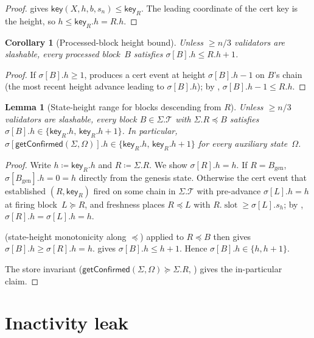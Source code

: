 \documentclass{article}
\newcommand{\genesis}{\ensuremath{B_{\mathrm{gen}}}}
\newcommand{\T}[0]{\ensuremath{\mathcal{T}}}
\newcommand{\slot}[0]{\ensuremath{\operatorname{\mathrm{slot}}}}
\newcommand{\key}{\mathsf{key}}
\newcommand{\getConfirmed}{\textsf{getConfirmed}\xspace}
\theoremstyle{plain}
\newtheorem{corollary}{Corollary}
\newtheorem{lemma}{Lemma}
\theoremstyle{definition}
\theoremstyle{remark}
\begin{document}
\begin{proof}
 gives $\key(X, h, b, s_n) \leq \key_R$. The leading coordinate of the cert key is the height, so $h \leq \key_R.h = R.h$.
\end{proof}

\begin{corollary}[Processed-block height bound]\label{rev:cor:processed-height-bound}
Unless $\geq n/3$ validators are slashable, every processed block~$B$ satisfies $\sigma[B].h \leq R.h + 1$.
\end{corollary}

\begin{proof}
If $\sigma[B].h \geq 1$,  produces a cert event at height $\sigma[B].h - 1$ on $B$'s chain (the most recent height advance leading to $\sigma[B].h$); by , $\sigma[B].h - 1 \leq R.h$.
\end{proof}

\begin{lemma}[State-height range for blocks descending from $R$]\label{rev:lem:confirmed-h-range}
Unless $\geq n/3$ validators are slashable, every block $B \in \Sigma.\T$ with $\Sigma.R \preceq B$ satisfies $\sigma[B].h \in \{\key_R.h,\, \key_R.h + 1\}$. In particular, $\sigma[\getConfirmed(\Sigma, \Omega)].h \in \{\key_R.h,\, \key_R.h + 1\}$ for every auxiliary state~$\Omega$.
\end{lemma}

\begin{proof}
Write $h \coloneqq \key_R.h$ and $R \coloneqq \Sigma.R$. We show $\sigma[R].h = h$. If $R = \genesis$, $\sigma[\genesis].h = 0 = h$ directly from the genesis state. Otherwise the cert event that established $(R, \key_R)$ fired on some chain in $\Sigma.\T$ with pre-advance $\sigma[L].h = h$ at firing block~$L \succeq R$, and freshness places $R \preceq L$ with $R.\slot \geq \sigma[L].s_h$; by , $\sigma[R].h = \sigma[L].h = h$.

 (state-height monotonicity along $\preceq$) applied to $R \preceq B$ then gives $\sigma[B].h \geq \sigma[R].h = h$.  gives $\sigma[B].h \leq h+1$. Hence $\sigma[B].h \in \{h, h+1\}$.

The store invariant ($\getConfirmed(\Sigma, \Omega) \succeq \Sigma.R$, ) gives the in-particular claim.
\end{proof}

\section{Inactivity leak}
\end{document}
